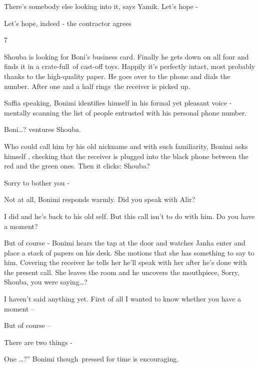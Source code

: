 \documentclass[letterpaper]{article}
\begin{document}
{\textquotedbl}There's somebody else looking into it,{\textquotedbl} says Yamik. {\textquotedbl}Let's hope
-{\textquotedbl} 

{\textquotedbl}Let's hope, indeed -{\textquotedbl} the contractor agrees


\bigskip

7 \ 

Shouba is looking for Boni's business card. Finally he gets down on all four and finds it in a crate-full~of cast-off
toys. Happily it's perfectly intact, most probably thanks to the high-quality paper. He goes over to the phone and
dials the number. After one and a half rings~the receiver is picked up.

{\textquotedbl}Saffia speaking,{\textquotedbl} Bonimi identifies himself in his formal yet pleasant voice - mentally
scanning the list of people entrusted with his personal phone number.

{\textquotedbl}Boni{\dots}?{\textquotedbl} ventures Shouba. 

Who could call him by his old nickname and with such familiarity, Bonimi asks himself , checking that the receiver is
plugged into the black phone between the red and the green ones. Then it clicks: {\textquotedbl}Shouba?{\textquotedbl} 

{\textquotedbl}Sorry to bother you -{\textquotedbl}

{\textquotedbl}Not at all,{\textquotedbl} Bonimi responds warmly. {\textquotedbl}Did you speak with Alir?{\textquotedbl}

{\textquotedbl}I did and he's back to his old self. But this call isn't to do with him. Do you have a
moment?{\textquotedbl}

{\textquotedbl}But of course -{\textquotedbl} Bonimi hears the tap at the door and watches Janha enter and place a stack
of papers on his desk. She motions that she has something to say to him. Covering the receiver he tells her he'll speak
with her after he's done with the present call. She leaves the room and he uncovers the mouthpiece,
{\textquotedbl}Sorry, Shouba, you were saying{\dots}?{\textquotedbl}

{\textquotedbl}I haven't said anything yet. First of all I wanted to know whether you have a moment --{\textquotedbl}

{\textquotedbl}But of course --{\textquotedbl} 

{\textquotedbl}There are two things -{\textquotedbl}

{\textquotedbl}One {\dots}?'' Bonimi though~pressed for time is encouraging. 
\end{document}
